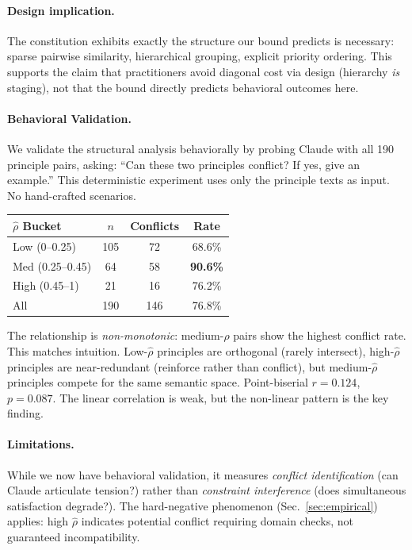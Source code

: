 \documentclass{article}
\theoremstyle{plain}
\theoremstyle{definition}
\theoremstyle{remark}
\newcommand{\rhohat}{\hat{\rho}}
\newcommand{\secref}[1]{Sec.~\ref{#1}}
\begin{document}
\paragraph{Design implication.} The constitution exhibits exactly the structure our bound predicts is necessary: sparse pairwise similarity, hierarchical grouping, explicit priority ordering. This supports the claim that practitioners avoid diagonal cost via design (hierarchy \emph{is} staging), not that the bound directly predicts behavioral outcomes here.

\paragraph{Behavioral Validation.} We validate the structural analysis behaviorally by probing Claude with all 190 principle pairs, asking: ``Can these two principles conflict? If yes, give an example.'' This deterministic experiment uses only the principle texts as input. No hand-crafted scenarios.

\begin{center}
\small
\begin{tabular}{lccc}
\toprule
$\rhohat$ Bucket & $n$ & Conflicts & Rate \\
\midrule
Low (0--0.25) & 105 & 72 & 68.6\% \\
Med (0.25--0.45) & 64 & 58 & \textbf{90.6\%} \\
High (0.45--1) & 21 & 16 & 76.2\% \\
\midrule
All & 190 & 146 & 76.8\% \\
\bottomrule
\end{tabular}
\end{center}

\noindent The relationship is \emph{non-monotonic}: medium-$\rhohat$ pairs show the highest conflict rate. This matches intuition. Low-$\rhohat$ principles are orthogonal (rarely intersect), high-$\rhohat$ principles are near-redundant (reinforce rather than conflict), but medium-$\rhohat$ principles compete for the same semantic space. Point-biserial $r = 0.124$, $p = 0.087$. The linear correlation is weak, but the non-linear pattern is the key finding.

\paragraph{Limitations.} While we now have behavioral validation, it measures \emph{conflict identification} (can Claude articulate tension?) rather than \emph{constraint interference} (does simultaneous satisfaction degrade?). The hard-negative phenomenon (\secref{sec:empirical}) applies: high $\rhohat$ indicates potential conflict requiring domain checks, not guaranteed incompatibility.
\end{document}
